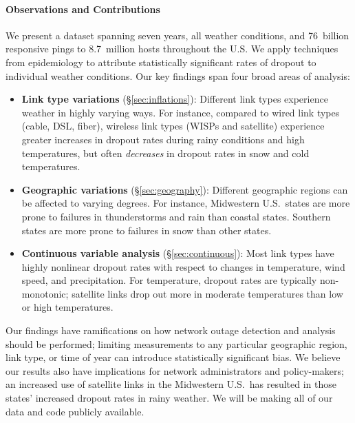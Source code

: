 \paragraph{Observations and Contributions}
%
We present a dataset spanning seven years, all weather conditions, and
76~billion responsive pings to 8.7~million hosts throughout the U.S. 
%
We apply techniques from epidemiology to attribute statistically
significant rates of dropout to individual weather conditions.
%
Our key findings span four broad areas of analysis:

\begin{itemize}

\item \textbf{Link type variations} (\S\ref{sec:inflations}): Different link
types experience weather in highly varying ways.  For instance, compared to
wired link types (cable, DSL, fiber), wireless link types (WISPs and satellite)
experience greater increases in dropout rates during rainy conditions and high
temperatures, but often \emph{decreases} in dropout rates in snow and cold
temperatures.

\item \textbf{Geographic variations} (\S\ref{sec:geography}): Different
geographic regions can be affected to varying degrees.  For instance,
Midwestern U.S.~states are more prone to failures in thunderstorms and rain
than coastal states.  Southern states are more prone to failures in snow than
other states.

\item \textbf{Continuous variable analysis} (\S\ref{sec:continuous}): Most link
types have highly nonlinear dropout rates with respect to changes in
temperature, wind speed, and precipitation.  For temperature, dropout rates are
typically non-monotonic; satellite links drop out more in moderate temperatures
than low or high temperatures.


\end{itemize}

Our findings have ramifications on how network outage detection and analysis
should be performed; limiting measurements to any particular geographic region,
link type, or time of year can introduce statistically significant bias.
%
We believe our results also have implications for network administrators and
policy-makers; an increased use of satellite links in the Midwestern U.S.~has
resulted in those states' increased dropout rates in rainy weather.
%
We will be making all of our data and code publicly available.

